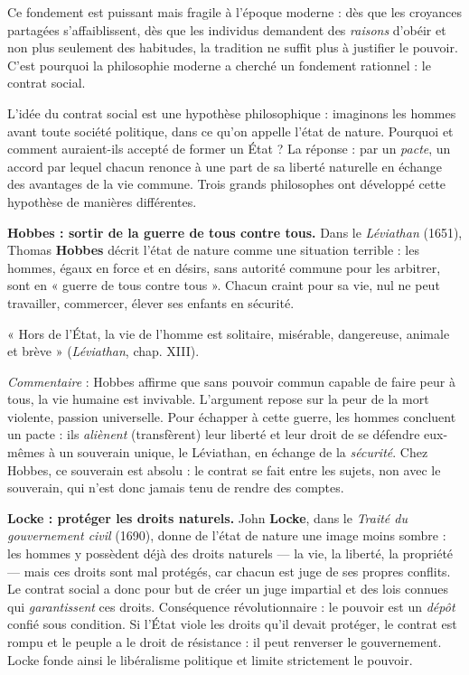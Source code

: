 \documentclass[11pt]{article}
\newcommand{\cle}[1]{{\popxbold\color{popdark}#1}}
\newcounter{popsec}
\newcounter{popsub}
\newcommand{\courssub}[1]{%
  \stepcounter{popsub}%
  \par\vspace{9pt}\noindent{\popxbold\fontsize{11.5}{13}\selectfont\color{popink}{\color{poporange}\thepopsec.\thepopsub}\hspace{6pt}#1}\par\nopagebreak\vspace{4pt}
}
\begin{document}
Ce fondement est puissant mais fragile à l'époque moderne : dès que les croyances partagées s'affaiblissent, dès que les individus demandent des \emph{raisons} d'obéir et non plus seulement des habitudes, la tradition ne suffit plus à justifier le pouvoir. C'est pourquoi la philosophie moderne a cherché un fondement rationnel : le contrat social.

\courssub{Troisième fondement : le contrat social}

L'idée du \cle{contrat social} est une hypothèse philosophique : imaginons les hommes avant toute société politique, dans ce qu'on appelle l'\cle{état de nature}. Pourquoi et comment auraient-ils accepté de former un État ? La réponse : par un \emph{pacte}, un accord par lequel chacun renonce à une part de sa liberté naturelle en échange des avantages de la vie commune. Trois grands philosophes ont développé cette hypothèse de manières différentes.

\textbf{Hobbes : sortir de la guerre de tous contre tous.} Dans le \emph{Léviathan} (1651), Thomas \textbf{Hobbes} décrit l'état de nature comme une situation terrible : les hommes, égaux en force et en désirs, sans autorité commune pour les arbitrer, sont en « guerre de tous contre tous ». Chacun craint pour sa vie, nul ne peut travailler, commercer, élever ses enfants en sécurité.

\begin{aretenir}
« Hors de l'État, la vie de l'homme est solitaire, misérable, dangereuse, animale et brève » (\emph{Léviathan}, chap. XIII). \par
\emph{Commentaire} : Hobbes affirme que sans pouvoir commun capable de faire peur à tous, la vie humaine est invivable. L'argument repose sur la peur de la mort violente, passion universelle. Pour échapper à cette guerre, les hommes concluent un pacte : ils \emph{aliènent} (transfèrent) leur liberté et leur droit de se défendre eux-mêmes à un \cle{souverain} unique, le Léviathan, en échange de la \emph{sécurité}. Chez Hobbes, ce souverain est absolu : le contrat se fait entre les sujets, non avec le souverain, qui n'est donc jamais tenu de rendre des comptes.
\end{aretenir}

\textbf{Locke : protéger les droits naturels.} John \textbf{Locke}, dans le \emph{Traité du gouvernement civil} (1690), donne de l'état de nature une image moins sombre : les hommes y possèdent déjà des \cle{droits naturels} — la vie, la liberté, la propriété — mais ces droits sont mal protégés, car chacun est juge de ses propres conflits. Le contrat social a donc pour but de créer un juge impartial et des lois connues qui \emph{garantissent} ces droits. Conséquence révolutionnaire : le pouvoir est un \emph{dépôt} confié sous condition. Si l'État viole les droits qu'il devait protéger, le contrat est rompu et le peuple a le \cle{droit de résistance} : il peut renverser le gouvernement. Locke fonde ainsi le libéralisme politique et limite strictement le pouvoir.
\end{document}
